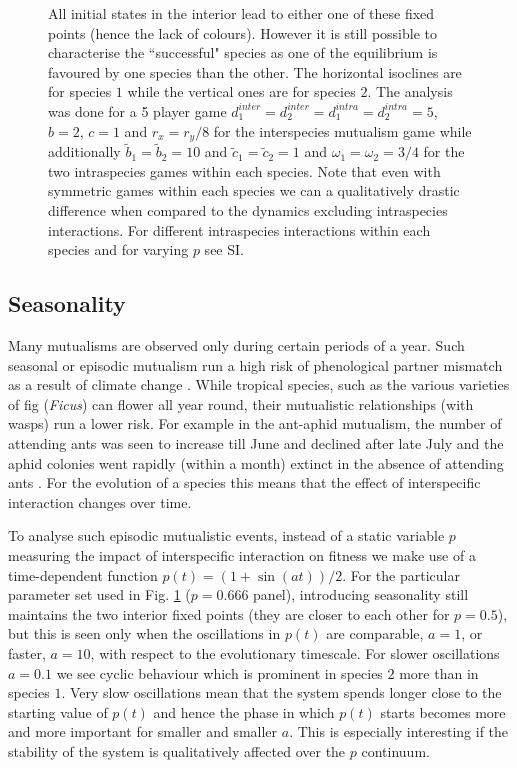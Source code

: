 \documentclass[12pt]{article}
\begin{document}
\begin{figure}
\begin{center}
{{All initial states in the interior lead to either one of these fixed points (hence the lack of colours).
However it is still possible to characterise the ``successful" species as one of the equilibrium is favoured by one species than the other.
The horizontal isoclines are for species $1$ while the vertical ones are for species $2$.
The analysis was done for a 5 player game $d_1^{inter} = d_2^{inter} = d_1^{intra} = d_2^{intra} = 5$, $b=2$, $c=1$ and $r_x = r_y /8$ for the interspecies mutualism game while additionally $\tilde{b}_1 = \tilde{b}_2 = 10$ and $\tilde{c}_1 = \tilde{c}_2 = 1$ and $\omega_1 = \omega_2 = 3/4$ for the two intraspecies games within each species. Note that even with symmetric games within each species we can a qualitatively drastic difference when compared to the dynamics excluding intraspecies interactions.  For different intraspecies interactions within each species and for varying $p$ see SI.}
\label{fig:mainexampleone}
}
\end{center}
\end{figure}

\subsection{Seasonality}

Many mutualisms are observed only during certain periods of a year.
Such seasonal or episodic mutualism run a high risk of phenological partner mismatch as a result of climate change \citep{rafferty:Oikos:2015}.
While tropical species, such as the various varieties of fig (\textit{Ficus}) can flower all year round, their mutualistic relationships (with wasps) run a lower risk.
For example in the ant-aphid mutualism, the number of attending ants was seen to increase till June and declined after late July and the aphid colonies went rapidly (within a month) extinct in the absence of attending ants \citep{yao:Oikos:2000,yao:JIS:2009}.
For the evolution of a species this means that the effect of interspecific interaction changes over time.

To analyse such episodic mutualistic events, instead of a static variable $p$ measuring the impact of interspecific interaction on fitness we make use of a time-dependent function $p(t) = (1 + \sin(a t))/2 $.
For the particular parameter set used in Fig. \ref{fig:mainexampleone} ($p=0.666$ panel), introducing seasonality still maintains the two interior fixed points (they are closer to each other for $p = 0.5$), but this is seen only when the oscillations in $p(t)$  are comparable, $a=1$, or faster, $a=10$, with respect to the evolutionary timescale.
For slower oscillations $a=0.1$ we see cyclic behaviour which is prominent in species $2$ more than in species $1$.
Very slow oscillations mean that the system spends longer close to the starting value of $p(t)$ and hence the phase in which $p(t)$ starts becomes more and more important for smaller and smaller $a$. 
This is especially interesting if the stability of the system is qualitatively affected over the $p$ continuum.
\end{document}
